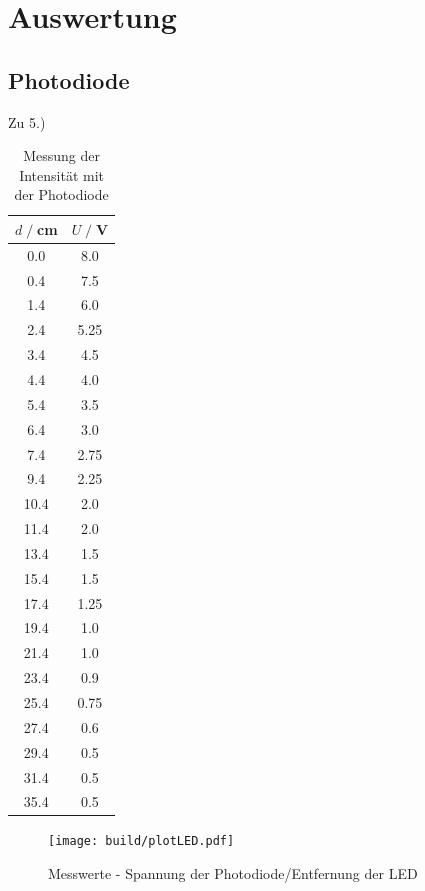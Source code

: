 \newpage
\section{Auswertung}
\label{sec:Auswertung}
\subsection{Photodiode}
Zu 5.)\\

\begin{table}
    \centering
    \begin{tabular}{c c}
        \toprule
        $d\;/\;$cm & $U\;/\;$V\\
        \midrule
        0.0 & 8.0 \\ 
        0.4 & 7.5 \\ 
        1.4 & 6.0 \\ 
        2.4 & 5.25 \\ 
        3.4 & 4.5 \\ 
        4.4 & 4.0 \\ 
        5.4 & 3.5 \\ 
        6.4 & 3.0 \\ 
        7.4 & 2.75 \\ 
        9.4 & 2.25 \\ 
        10.4 & 2.0 \\ 
        11.4 & 2.0 \\ 
        13.4 & 1.5 \\ 
        15.4 & 1.5 \\ 
        17.4 & 1.25 \\ 
        19.4 & 1.0 \\ 
        21.4 & 1.0 \\ 
        23.4 & 0.9 \\ 
        25.4 & 0.75 \\ 
        27.4 & 0.6 \\ 
        29.4 & 0.5 \\ 
        31.4 & 0.5 \\ 
        35.4 & 0.5 \\ 
        \bottomrule
    \end{tabular}
    \caption{Messung der Intensität mit der Photodiode}
    \label{tab:LED_werte}
\end{table}

\begin{figure}
    \centering
    \texttt{[image: build/plotLED.pdf]}
    \caption{Messwerte - Spannung der Photodiode/Entfernung der LED}        
    \label{fig:plotLED}
\end{figure}

